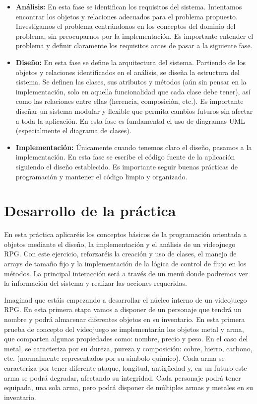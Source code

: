 \documentclass[11pt,a4paper]{article}
\begin{document}
\begin{itemize}
    \item \textbf{Análisis:} En esta fase se identifican los requisitos del sistema. Intentamos encontrar los objetos y relaciones adecuados para el problema propuesto. Investigamos el problema centrándonos en los conceptos del dominio del problema, sin preocuparnos por la implementación. Es importante entender el problema y definir claramente los requisitos antes de pasar a la siguiente fase.
    \item \textbf{Diseño:} En esta fase se define la arquitectura del sistema. Partiendo de los objetos y relaciones identificados en el análisis, se diseña la estructura del sistema. Se definen las clases, sus atributos y métodos (aún sin pensar en la implementación, solo en aquella funcionalidad que cada clase debe tener), así como las relaciones entre ellas (herencia, composición, etc.). Es importante diseñar un sistema modular y flexible que permita cambios futuros sin afectar a toda la aplicación. En esta fase es fundamental el uso de diagramas UML (especialmente el diagrama de clases).
    \item \textbf{Implementación:} Únicamente cuando tenemos claro el diseño, pasamos a la implementación. En esta fase se escribe el código fuente de la aplicación siguiendo el diseño establecido. Es importante seguir buenas prácticas de programación y mantener el código limpio y organizado.
\end{itemize}

\section{Desarrollo de la práctica}

En esta práctica aplicaréis los conceptos básicos de la programación orientada a objetos mediante el diseño, la implementación y el análisis de un videojuego RPG. Con este ejercicio, reforzaréis la creación y uso de clases, el manejo de arrays de tamaño fijo y la implementación de la lógica de control de flujo en los métodos. La principal interacción será a través de un menú donde podremos ver la información del sistema y realizar las acciones requeridas.

Imaginad que estáis empezando a desarrollar el núcleo interno de un videojuego RPG. En esta primera etapa vamos a disponer de un personaje que tendrá un nombre y podrá almacenar diferentes objetos en su inventario. En esta primera prueba de concepto del videojuego se implementarán los objetos metal y arma, que comparten algunas propiedades como: nombre, precio y peso. En el caso del metal, se caracteriza por su dureza, pureza y composición: cobre, hierro, carbono, etc. (normalmente representados por su símbolo químico). Cada arma se caracteriza por tener diferente ataque, longitud, antigüedad y, en un futuro este arma se podrá degradar, afectando su integridad. Cada personaje podrá tener equipada, una sola arma, pero podrá disponer de múltiples armas y metales en su inventario.
\end{document}
